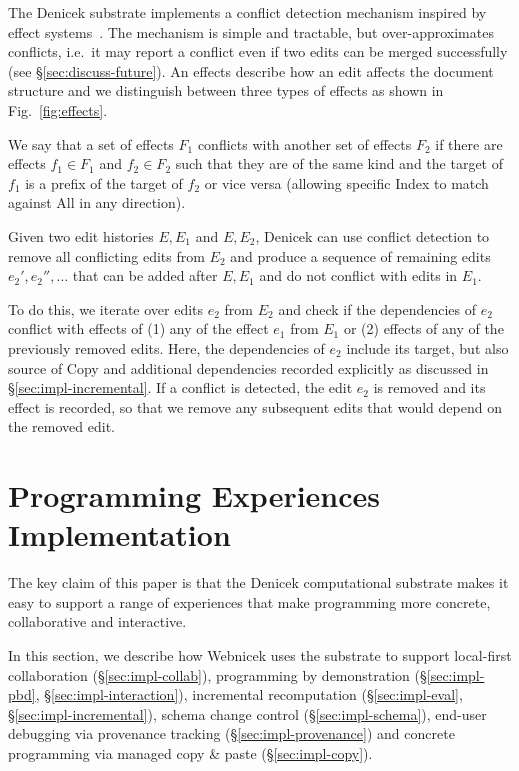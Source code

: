 \documentclass[sigconf,anonymous,screen]{acmart}
\newcommand{\ident}[1]{{\sffamily #1}}
\begin{document}
The Denicek substrate implements a conflict detection mechanism inspired by effect
systems~\cite{lucassen-1988-effects}. The mechanism is simple and tractable, but over-approximates
conflicts, i.e.~it may report a conflict even if two edits can be merged successfully
(see \S\ref{sec:discuss-future}). An effects describe how an edit affects the document structure
and we distinguish between three types of effects as shown in Fig.~\ref{fig:effects}.

We say that a set of effects $F_1$ conflicts with another set of effects $F_2$ if there
are effects $f_1\in F_1$ and $f_2\in F_2$ such that they are of the same kind and the target
of $f_1$ is a prefix of the target of $f_2$ or vice versa (allowing specific \ident{Index} to
match against \ident{All} in any direction).

Given two edit histories $E, E_1$ and $E, E_2$, Denicek can use conflict detection to remove
all conflicting edits from $E_2$ and produce a sequence of remaining edits $e_2', e_2'', \ldots$
that can be added after $E, E_1$ and do not conflict with edits in $E_1$.

To do this, we iterate over edits $e_2$ from $E_2$ and check if the dependencies of $e_2$
conflict with effects of (1) any of the effect $e_1$ from $E_1$ or (2) effects of any of the
previously removed edits. Here, the dependencies of $e_2$ include its target, but also source
of \ident{Copy} and additional dependencies recorded explicitly as discussed in
\S\ref{sec:impl-incremental}. If a conflict is detected, the edit $e_2$ is removed and its effect
is recorded, so that we remove any subsequent edits that would depend on the removed edit.


\section{Programming Experiences Implementation}
\label{sec:impl}

The key claim of this paper is that the Denicek computational substrate
makes it easy to support a range of experiences that make programming more concrete,
collaborative and interactive.

In this section, we describe how Webnicek uses the substrate
to support local-first collaboration (\S\ref{sec:impl-collab}), programming by
demonstration (\S\ref{sec:impl-pbd}, \S\ref{sec:impl-interaction}), incremental recomputation
(\S\ref{sec:impl-eval}, \S\ref{sec:impl-incremental}), schema change control (\S\ref{sec:impl-schema}),
end-user debugging via provenance tracking (\S\ref{sec:impl-provenance})
and concrete programming via managed copy \& paste (\S\ref{sec:impl-copy}).
\end{document}
